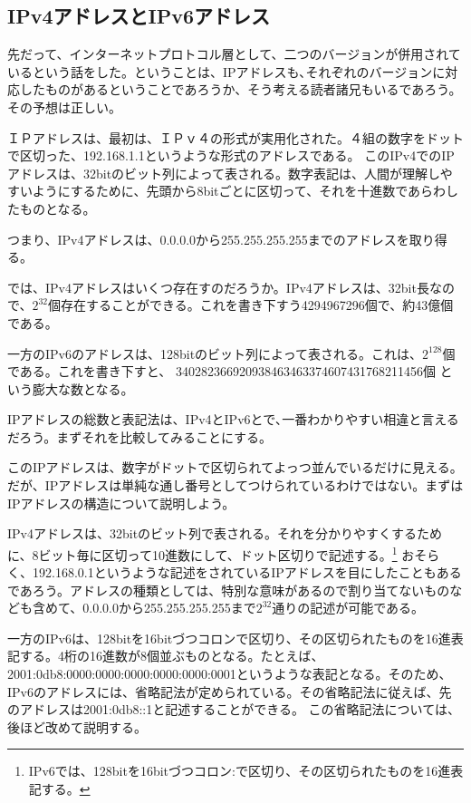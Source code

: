 \subsection{IPv4アドレスとIPv6アドレス}

先だって、インターネットプロトコル層として、二つのバージョンが併用されているという話をした。ということは、IPアドレスも､それぞれのバージョンに対応したものがあるということであろうか、そう考える読者諸兄もいるであろう。その予想は正しい。

ＩＰアドレスは、最初は、ＩＰｖ４の形式が実用化された。４組の数字をドットで区切った、192.168.1.1というような形式のアドレスである。
このIPv4でのIPアドレスは、32bitのビット列によって表される。数字表記は、人間が理解しやすいようにするために、先頭から8bitごとに区切って、それを十進数であらわしたものとなる。

つまり、IPv4アドレスは、0.0.0.0から255.255.255.255までのアドレスを取り得る。

では、IPv4アドレスはいくつ存在すのだろうか。IPv4アドレスは、32bit長なので、$2^{32}$個存在することができる。これを書き下すう4294967296個で、約43億個である。

一方のIPv6のアドレスは、128bitのビット列によって表される。これは、$2^{128}$個である。これを書き下すと、
340282366920938463463374607431768211456個
という膨大な数となる。

IPアドレスの総数と表記法は、IPv4とIPv6とで､一番わかりやすい相違と言えるだろう。まずそれを比較してみることにする。

このIPアドレスは、数字がドットで区切られてよっつ並んでいるだけに見える。だが、IPアドレスは単純な通し番号としてつけられているわけではない。まずはIPアドレスの構造について説明しよう。

IPv4アドレスは、32bitのビット列で表される。それを分かりやすくするために、8ビット毎に区切って10進数にして、ドット区切りで記述する。\footnote{IPv6では、128bitを16bitづつコロン:で区切り、その区切られたものを16進表記する。} おそらく、192.168.0.1というような記述をされているIPアドレスを目にしたこともあるであろう。アドレスの種類としては、特別な意味があるので割り当てないものなども含めて、0.0.0.0から255.255.255.255まで$2^{32}$通りの記述が可能である。

一方のIPv6は、128bitを16bitづつコロンで区切り、その区切られたものを16進表記する。4桁の16進数が8個並ぶものとなる。たとえば、2001:0db8:0000:0000:0000:0000:0000:0001というような表記となる。そのため、IPv6のアドレスには、省略記法が定められている。その省略記法に従えば、先のアドレスは2001:0db8::1と記述することができる。
この省略記法については、後ほど改めて説明する。




